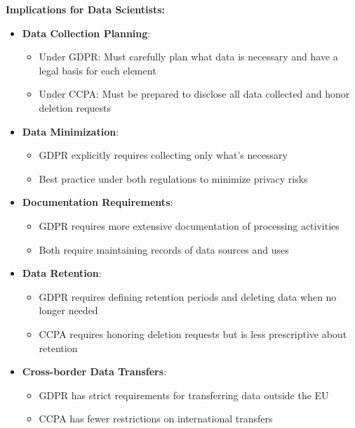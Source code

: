 \documentclass[12pt]{article}
\begin{document}
\begin{enumerate}
\begin{tcolorbox}[colback=blue!5!white,colframe=blue!75!black,title={Solution}]
    \textbf{Implications for Data Scientists:}
    
    \begin{itemize}
        \item \textbf{Data Collection Planning}:
          \begin{itemize}
              \item Under GDPR: Must carefully plan what data is necessary and have a legal basis for each element
              \item Under CCPA: Must be prepared to disclose all data collected and honor deletion requests
          \end{itemize}
        
        \item \textbf{Data Minimization}:
          \begin{itemize}
              \item GDPR explicitly requires collecting only what's necessary
              \item Best practice under both regulations to minimize privacy risks
          \end{itemize}
        
        \item \textbf{Documentation Requirements}:
          \begin{itemize}
              \item GDPR requires more extensive documentation of processing activities
              \item Both require maintaining records of data sources and uses
          \end{itemize}
        
        \item \textbf{Data Retention}:
          \begin{itemize}
              \item GDPR requires defining retention periods and deleting data when no longer needed
              \item CCPA requires honoring deletion requests but is less prescriptive about retention
          \end{itemize}
        
        \item \textbf{Cross-border Data Transfers}:
          \begin{itemize}
              \item GDPR has strict requirements for transferring data outside the EU
              \item CCPA has fewer restrictions on international transfers
          \end{itemize}
        

\end{itemize}
\end{tcolorbox}
\end{enumerate}
\end{document}
